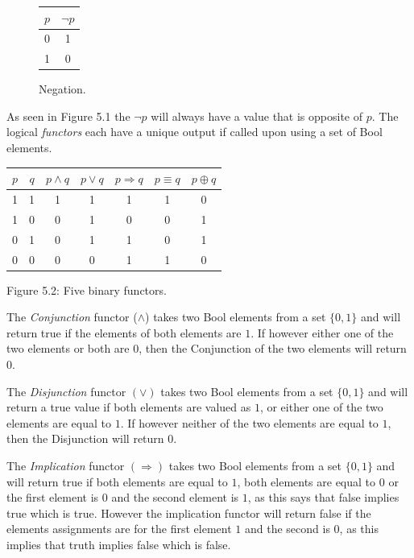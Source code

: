 \documentclass[11pt,a4paper, notitlepage]{report}
\begin{document}
\begin{figure}[H]
\centering
\label{tab:negation}
\begin{tabular}{|c|c|}
\hline
$p$ & $\neg p$\\ \hline
0 & 1 \\
1 & 0 \\
\hline
\end{tabular}
\caption{Negation.}
\end{figure}

As seen in Figure 5.1 the $\neg p$ will always have a value that is opposite of $p$.
The logical \emph{functors} each have a unique output if called upon using a set of Bool elements.
\begin{center}
\begin{tabular}{|c|c||c|c|c|c|c|}
\hline
$p$ & $q$ & $p \land q$ & $p \lor q$ & $p \Rightarrow q$ & $p \equiv q$ & $p \oplus q$		\\ \hline
1 & 1 & 1 & 1 & 1 & 1 & 0\\
1 & 0 & 0 & 1 & 0 & 0 & 1\\
0 & 1 & 0 & 1 & 1 & 0 & 1\\
0 & 0 & 0 & 0 & 1 & 1 & 0\\
\hline
\end{tabular}
\end{center}
\begin{center}
\label{Figure:5.2}{Figure 5.2: Five binary functors.}
\end{center}

The \emph{Conjunction} functor ($\land$) takes two Bool elements from a set $\{0,1\}$ and will return true if the elements of both elements are $1$. If however either one of the two elements or both are $0$, then the Conjunction of the two elements will return $0$.

The \emph{Disjunction} functor $(\lor)$ takes two Bool elements from a set $\{0,1\}$ and will return a true value if both elements are valued as $1$, or either one of the two elements are equal to $1$. If however neither of the two elements are equal to $1$, then the Disjunction will return $0$.

The \emph{Implication} functor $(\Rightarrow)$ takes two Bool elements from a set $\{0,1\}$ and will return true if both elements are equal to $1$, both elements are equal to $0$ or the first element is $0$ and the second element is $1$, as this says that false implies true which is true. However the implication functor will return false if the elements assignments are for the first element $1$ and the second is $0$, as this implies that truth implies false which is false.
\end{document}
